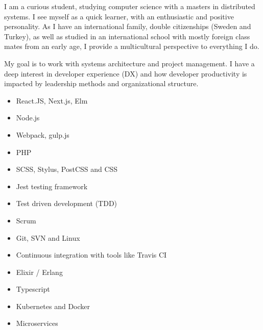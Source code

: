 I am a curious student, studying computer science with a masters in distributed systems. 
I see myself as a quick learner, with an enthusiastic and positive personality. As I have an international family, double citizenships (Sweden and Turkey), as well as studied in an international school with mostly foreign class mates from an early age, I provide a multicultural perspective to everything I do.

My goal is to work with systems architecture and project management. I have a deep interest in developer experience (DX) and how developer productivity is impacted by leadership methods and organizational structure.



\divider




\begin{itemize}
    \item React.JS, Next.js, Elm
    \item Node.js
    \item Webpack, gulp.js
    \item PHP
    \item SCSS, Stylus, PostCSS and CSS
    \item Jest testing framework
\end{itemize}


\divider

\begin{itemize}
    \item Test driven development (TDD)
    \item Scrum
    \item Git, SVN and Linux
    \item Continuous integration with tools like Travis CI
    \item Elixir / Erlang
    \item Typescript
    \item Kubernetes and Docker
    \item Microservices
\end{itemize}





